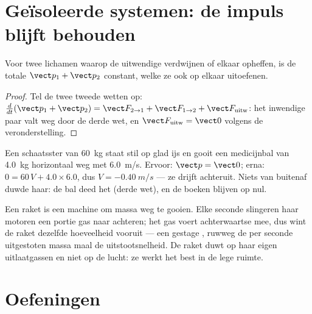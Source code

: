 \section{Geïsoleerde systemen: de impuls blijft behouden}

\begin{proposition}\label{prop:g12:newtons-laws:conservation}
Voor twee lichamen waarop de uitwendige  verdwijnen of elkaar opheffen, is de
totale  $\vect p_1 + \vect p_2$ constant, welke  ze ook op elkaar
uitoefenen.
\end{proposition}

\begin{proof}
Tel de twee tweede wetten op:
$\frac{d}{dt}(\vect p_1 + \vect p_2) = \vect F_{2 \to 1} + \vect F_{1 \to 2} +
\vect F_{\text{uitw}}$: het inwendige paar valt weg door de derde wet, en
$\vect F_{\text{uitw}} = \vect 0$ volgens de veronderstelling.
\end{proof}

\begin{example}[Terugstoot]\label{ex:g12:newtons-laws:recoil}
Een schaatsster van \qty{60}{kg} staat stil op glad ijs en gooit een medicijnbal van
\qty{4.0}{kg} horizontaal weg met \qty{6.0}{m/s}. Ervoor: $\vect p = \vect 0$; erna:
$0 = 60\,V + 4.0 \times 6.0$, dus $V = \qty{-0.40}{m/s}$ --- ze drijft achteruit.
Niets van buitenaf duwde haar: de bal deed het (derde wet), en de boeken blijven op
nul.
\end{example}

\begin{remark}\label{rem:g12:newtons-laws:rocket}
Een raket is een machine om massa weg te gooien. Elke seconde slingeren haar motoren
een portie gas naar achteren; het gas voert achterwaartse  mee, dus wint de
raket dezelfde hoeveelheid vooruit --- een gestage , ruwweg de per seconde
uitgestoten massa maal de uitstootsnelheid. De raket duwt op haar eigen uitlaatgassen
en niet op de lucht: ze werkt het best in de lege ruimte.
\end{remark}

\section{Oefeningen}

